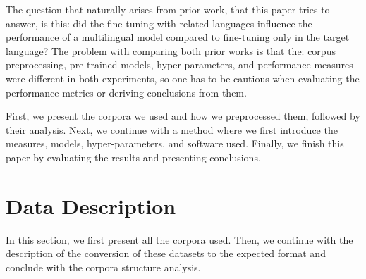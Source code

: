 \documentclass[sigconf]{acmart}
\begin{document}
The question that naturally arises from prior work, that this paper tries to answer, is this: did the fine-tuning with related languages influence the performance of a multilingual model compared to fine-tuning only in the target language?
The problem with comparing both prior works is that the: corpus preprocessing, pre-trained models, hyper-parameters, and performance measures were different in both experiments, so one has to be cautious when evaluating the performance metrics or deriving conclusions from them.

First, we present the corpora we used and how we preprocessed them, followed by their analysis.
Next, we continue with a method where we first introduce the measures, models, hyper-parameters, and software used.
Finally, we finish this paper by evaluating the results and presenting conclusions.

\section{Data Description}
\label{sec:data-description}
In this section, we first present all the corpora used. Then, we continue with the description of the conversion of these datasets to the expected format and conclude with the corpora structure analysis.
\end{document}
